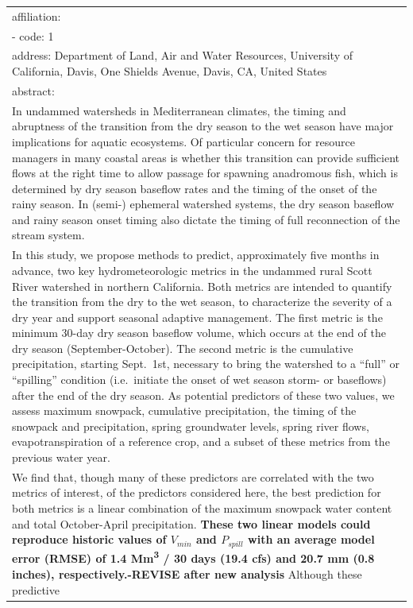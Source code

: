 \documentclass[
]{article}
\begin{document}
\begin{longtable}[]{@{}l@{}}
affiliation: \\
- code: 1 \\
address: Department of Land, Air and Water Resources, University of
California, Davis, One Shields Avenue, Davis, CA, United States \\
abstract: \textbar{} \\
In undammed watersheds in Mediterranean climates, the timing and
abruptness of the transition from the dry season to the wet season have
major implications for aquatic ecosystems. Of particular concern for
resource managers in many coastal areas is whether this transition can
provide sufficient flows at the right time to allow passage for spawning
anadromous fish, which is determined by dry season baseflow rates and
the timing of the onset of the rainy season. In (semi-) ephemeral
watershed systems, the dry season baseflow and rainy season onset timing
also dictate the timing of full reconnection of the stream system. \\
In this study, we propose methods to predict, approximately five months
in advance, two key hydrometeorologic metrics in the undammed rural
Scott River watershed in northern California. Both metrics are intended
to quantify the transition from the dry to the wet season, to
characterize the severity of a dry year and support seasonal adaptive
management. The first metric is the minimum 30-day dry season baseflow
volume, which occurs at the end of the dry season (September-October).
The second metric is the cumulative precipitation, starting Sept.~1st,
necessary to bring the watershed to a ``full'' or ``spilling'' condition
(i.e.~initiate the onset of wet season storm- or baseflows) after the
end of the dry season. As potential predictors of these two values, we
assess maximum snowpack, cumulative precipitation, the timing of the
snowpack and precipitation, spring groundwater levels, spring river
flows, evapotranspiration of a reference crop, and a subset of these
metrics from the previous water year. \\
We find that, though many of these predictors are correlated with the
two metrics of interest, of the predictors considered here, the best
prediction for both metrics is a linear combination of the maximum
snowpack water content and total October-April precipitation.
\textbf{These two linear models could reproduce historic values of
\(V_{min}\) and \(P_{spill}\) with an average model error (RMSE) of 1.4
Mm\textsuperscript{3} / 30 days (19.4 cfs) and 20.7 mm (0.8 inches),
respectively.-REVISE after new analysis } Although these predictive

\end{longtable}
\end{document}
